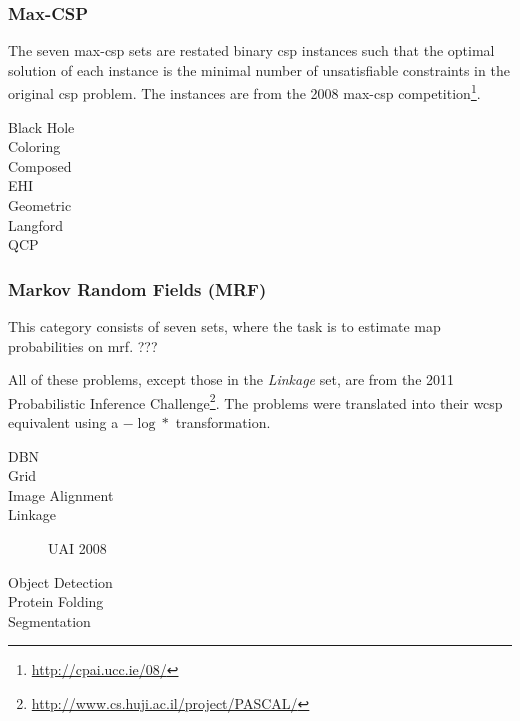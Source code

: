 
\subsubsection{Max-CSP}
The seven max-\gls{csp} sets are restated binary \gls{csp} instances such that the optimal solution of each instance is the minimal number of unsatisfiable constraints in the original \gls{csp} problem.
The instances are from the 2008 max-\gls{csp} competition\footnote{\url{http://cpai.ucc.ie/08/}}.


\begin{description}
	\item[Black Hole]
	\item[Coloring]
	\item[Composed]
	\item[EHI]
	\item[Geometric]
	\item[Langford]
	\item[QCP]
\end{description}

\subsubsection{Markov Random Fields (MRF)}
This category consists of seven sets, where the task is to estimate \gls{map} probabilities on \gls{mrf}. ???

All of these problems, except those in the \emph{Linkage} set, are from the 2011 Probabilistic Inference Challenge\footnote{\url{http://www.cs.huji.ac.il/project/PASCAL/}}.
The problems were translated into their \gls{wcsp} equivalent using a \(-\log*\) transformation.

\begin{description}
	\item[DBN]
	\item[Grid]
	\item[Image Alignment]
	\item[Linkage]
		\textcite{Favier01} UAI 2008
	\item[Object Detection]
	\item[Protein Folding]
	\item[Segmentation]
\end{description}


